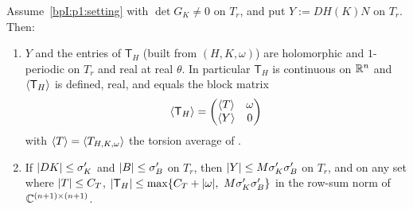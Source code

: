 \begin{lemma}\label{bpI:p1:extended-basic}
Assume~\ref{bpI:p1:setting} with $\det G_K\ne0$ on $T_r$, and put $Y:=DH(K)N$ on $T_r$. Then:
\begin{enumerate}[label=(\alph*)]
\item $Y$ and the entries of $\mathsf T_H$ (built from $(H,K,\omega)$) are holomorphic and $1$-periodic on $T_r$ and
  real at real $\theta$. In particular $\mathsf T_H$ is continuous on $\mathbb{R}^n$ and $\langle \mathsf T_H\rangle$ is defined, real, and equals
  the block matrix
  \[
  \langle \mathsf T_H\rangle=\begin{pmatrix}\langle T\rangle&\omega\\ \langle Y\rangle&0\end{pmatrix}
  \]
  with $\langle T\rangle=\langle T_{H,K,\omega}\rangle$ the torsion average of .
\item If $\lvert DK\rvert\le\sigma_K'$ and $\lvert B\rvert\le\sigma_B'$ on $T_r$, then $\lvert Y\rvert\le M\sigma_K'\sigma_B'$ on $T_r$, and
  on any set where $\lvert T\rvert\le C_T$,
  $\abs{\mathsf T_H}\le\max\{C_T+\abs\omega,\ M\sigma_K'\sigma_B'\}$ in the row-sum norm of $\mathbb{C}^{(n+1)\times(n+1)}$.
\end{enumerate}
\end{lemma}

